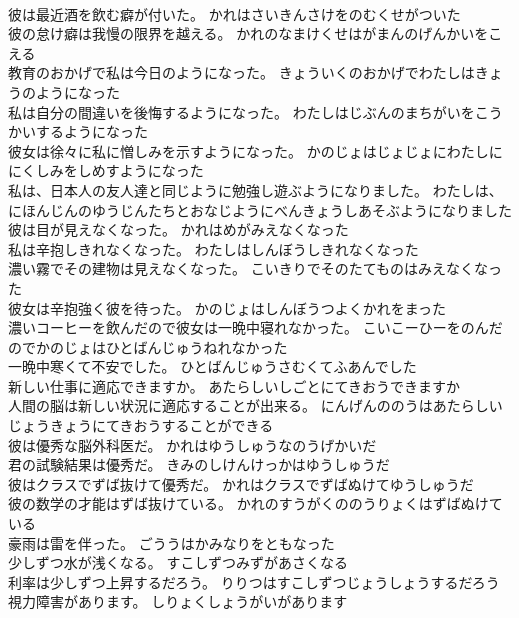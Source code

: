 \documentclass[8pt]{extreport}
\begin{document}
\begin{CJK}{UTF8}{min}
\\	彼は最近酒を飲む癖が付いた。	かれはさいきんさけをのむくせがついた 
\\	彼の怠け癖は我慢の限界を越える。	かれのなまけくせはがまんのげんかいをこえる 
\\	教育のおかげで私は今日のようになった。	きょういくのおかげでわたしはきょうのようになった 
\\	私は自分の間違いを後悔するようになった。	わたしはじぶんのまちがいをこうかいするようになった 
\\	彼女は徐々に私に憎しみを示すようになった。	かのじょはじょじょにわたしににくしみをしめすようになった 
\\	私は、日本人の友人達と同じように勉強し遊ぶようになりました。	わたしは、にほんじんのゆうじんたちとおなじようにべんきょうしあそぶようになりました 
\\	彼は目が見えなくなった。	かれはめがみえなくなった 
\\	私は辛抱しきれなくなった。	わたしはしんぼうしきれなくなった 
\\	濃い霧でその建物は見えなくなった。	こいきりでそのたてものはみえなくなった 
\\	彼女は辛抱強く彼を待った。	かのじょはしんぼうつよくかれをまった 
\\	濃いコーヒーを飲んだので彼女は一晩中寝れなかった。	こいこーひーをのんだのでかのじょはひとばんじゅうねれなかった 
\\	一晩中寒くて不安でした。	ひとばんじゅうさむくてふあんでした 
\\	新しい仕事に適応できますか。	あたらしいしごとにてきおうできますか 
\\	人間の脳は新しい状況に適応することが出来る。	にんげんののうはあたらしいじょうきょうにてきおうすることができる 
\\	彼は優秀な脳外科医だ。	かれはゆうしゅうなのうげかいだ 
\\	君の試験結果は優秀だ。	きみのしけんけっかはゆうしゅうだ 
\\	彼はクラスでずば抜けて優秀だ。	かれはクラスでずばぬけてゆうしゅうだ 
\\	彼の数学の才能はずば抜けている。	かれのすうがくののうりょくはずばぬけている 
\\	豪雨は雷を伴った。	ごううはかみなりをともなった 
\\	少しずつ水が浅くなる。	すこしずつみずがあさくなる 
\\	利率は少しずつ上昇するだろう。	りりつはすこしずつじょうしょうするだろう 
\\	視力障害があります。	しりょくしょうがいがあります 

\end{CJK}
\end{document}
